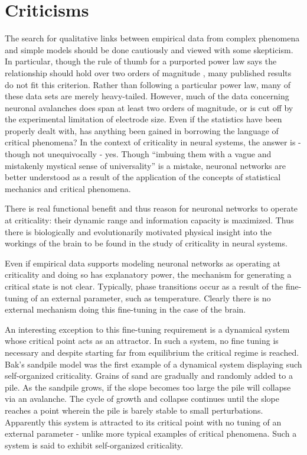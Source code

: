 \documentclass[12pt]{article}
\begin{document}
\section*{Criticisms} The search for qualitative links between empirical data from complex phenomena and simple models should be done cautiously and viewed with some skepticism. In particular, though the rule of thumb for a purported power law says the relationship should hold over two orders of magnitude \cite{Sethna2011a}, many published results do not fit this criterion. Rather than following a particular power law, many of these data sets are merely heavy-tailed. However, much of the data concerning neuronal avalanches does span at least two orders of magnitude, or is cut off by the experimental limitation of electrode size. Even if the statistics have been properly dealt with, has anything been gained in borrowing the language of critical phenomena? In the context of criticality in neural systems, the answer is - though not unequivocally - yes. Though ``imbuing them with a vague and mistakenly mystical sense of universality'' \cite{Stumpf2012a} is a mistake, neuronal networks are better understood as a result of the application of the concepts of statistical mechanics and critical phenomena. 

There is real functional benefit and thus reason for neuronal networks to operate at criticality: their dynamic range and information capacity is maximized. Thus there is biologically and evolutionarily motivated physical insight into the workings of the brain to be found in the study of criticality in neural systems.

Even if empirical data supports modeling neuronal networks as operating at criticality and doing so has explanatory power, the mechanism for generating a critical state is not clear. Typically, phase transitions occur as a result of the fine-tuning of an external parameter, such as temperature. Clearly there is no external mechanism doing this fine-tuning in the case of the brain. 

An interesting exception to this fine-tuning requirement is a dynamical system whose critical point acts as an attractor. In such a system, no fine tuning is necessary and despite starting far from equilibrium the critical regime is reached. Bak's sandpile model\cite{Bak1987a} was the first example of a dynamical system displaying such self-organized criticality. Grains of sand are gradually and randomly added to a pile. As the sandpile grows, if the slope becomes too large the pile will collapse via an avalanche. The cycle of growth and collapse continues until the slope reaches a point wherein the pile is barely stable to small perturbations. Apparently this system is attracted to its critical point with no tuning of an external parameter - unlike more typical examples of critical phenomena. Such a system is said to exhibit self-organized criticality.
   
\end{document}
